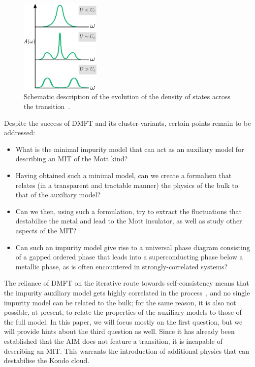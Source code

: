 \documentclass[reprint,superscriptaddress,floatfix]{revtex4-2}
\begin{document}
\begin{figure}[!htb]
	\centering
	\includegraphics[width=0.35\textwidth]{spec_func.pdf}
	\caption{Schematic description of the evolution of the density of states across the transition~\cite{zhang_1993}.}
	\label{spec-func_scheme}
\end{figure}

Despite the success of DMFT and its cluster-variants, certain points remain to be addressed:
\begin{itemize}
	\item What is the minimal impurity model that can act as an auxiliary model for describing an MIT of the Mott kind?
	\item Having obtained such a minimal model, can we create a formalism that relates (in a transparent and tractable manner) the physics of the bulk to that of the auxiliary model?
	\item Can we then, using such a formulation, try to extract the fluctuations that destabilise the metal and lead to the Mott insulator, as well as study other aspects of the MIT?
	\item {\color{blue}Can such an impurity model give rise to a universal phase diagram consisting of a gapped ordered phase that leads into a superconducting phase below a metallic phase, as is often encountered in strongly-correlated systems?}
\end{itemize}
The reliance of DMFT on the iterative route towards self-consistency means that the impurity auxiliary model gets highly correlated in the process~\cite{held2008}, and no single impurity model can be related to the bulk; for the same reason, it is also not possible, at present, to relate the properties of the auxiliary models to those of the full model. In this {\color{blue}paper}, we will focus mostly on the first question, but we will provide hints about the third question as well. Since it has already been established that the AIM does not feature a transition, it is incapable of describing an MIT. This warrants the introduction of additional physics that can destabilise the Kondo cloud.
\end{document}
